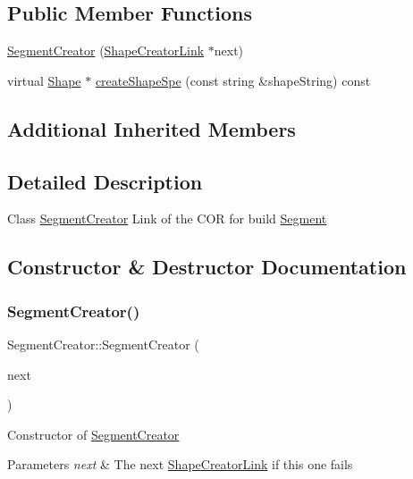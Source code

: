 \subsection*{Public Member Functions}
\begin{DoxyCompactItemize}
\item 
\hyperlink{class_segment_creator_ad46fd18ef535e6eb4ccb7a1edbf906c8}{Segment\+Creator} (\hyperlink{class_shape_creator_link}{Shape\+Creator\+Link} $\ast$next)
\item 
virtual \hyperlink{class_shape}{Shape} $\ast$ \hyperlink{class_segment_creator_ab19a7665cba20a6e0b44c57b3cb4ce77}{create\+Shape\+Spe} (const string \&shape\+String) const
\end{DoxyCompactItemize}
\subsection*{Additional Inherited Members}


\subsection{Detailed Description}
Class \hyperlink{class_segment_creator}{Segment\+Creator} Link of the C\+OR for build \hyperlink{class_segment}{Segment} 

\subsection{Constructor \& Destructor Documentation}
\hypertarget{class_segment_creator_ad46fd18ef535e6eb4ccb7a1edbf906c8}{}\label{class_segment_creator_ad46fd18ef535e6eb4ccb7a1edbf906c8} 
\subsubsection{\texorpdfstring{Segment\+Creator()}{SegmentCreator()}}
{\footnotesize\ttfamily Segment\+Creator\+::\+Segment\+Creator (\begin{DoxyParamCaption}\item[{\hyperlink{class_shape_creator_link}{Shape\+Creator\+Link} $\ast$}]{next }\end{DoxyParamCaption})}

Constructor of \hyperlink{class_segment_creator}{Segment\+Creator} 
\begin{DoxyParams}{Parameters}
{\em next} & The next \hyperlink{class_shape_creator_link}{Shape\+Creator\+Link} if this one fails \\
\hline
\end{DoxyParams}


